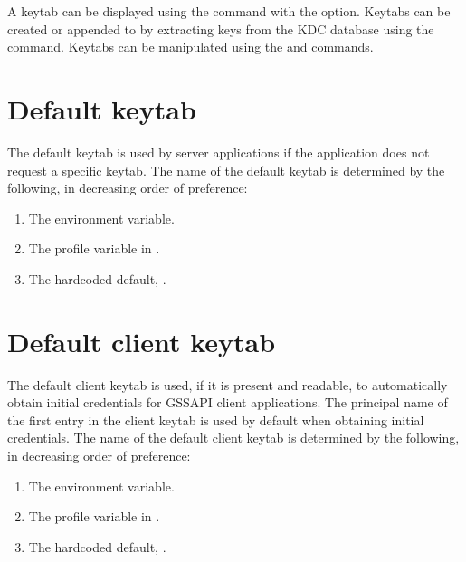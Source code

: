 \documentclass[letterpaper,10pt,english]{sphinxmanual}
\begin{document}
\sphinxAtStartPar
A keytab can be displayed using the  command with the
 option.  Keytabs can be created or appended to by extracting
keys from the KDC database using the  
command.  Keytabs can be manipulated using the  and
 commands.


\section{Default keytab}
\label{\detokenize{basic/keytab_def:default-keytab}}
\sphinxAtStartPar
The default keytab is used by server applications if the application
does not request a specific keytab.  The name of the default keytab is
determined by the following, in decreasing order of preference:
\begin{enumerate}
%
\item {} 
\sphinxAtStartPar
The  environment variable.

\item {} 
\sphinxAtStartPar
The  profile variable in .

\item {} 
\sphinxAtStartPar
The hardcoded default, .

\end{enumerate}


\section{Default client keytab}
\label{\detokenize{basic/keytab_def:default-client-keytab}}
\sphinxAtStartPar
The default client keytab is used, if it is present and readable, to
automatically obtain initial credentials for GSSAPI client
applications.  The principal name of the first entry in the client
keytab is used by default when obtaining initial credentials.  The
name of the default client keytab is determined by the following, in
decreasing order of preference:
\begin{enumerate}
%
\item {} 
\sphinxAtStartPar
The  environment variable.

\item {} 
\sphinxAtStartPar
The  profile variable in
.

\item {} 
\sphinxAtStartPar
The hardcoded default, .

\end{enumerate}
\end{document}
